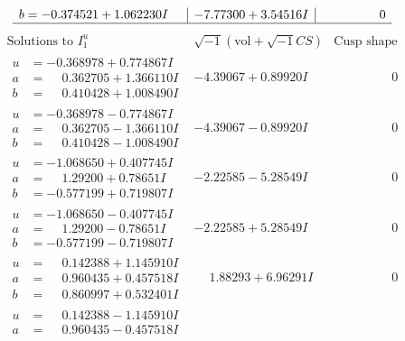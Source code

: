 \documentclass[1p]{elsarticle_modified}
\theoremstyle{definition}
\newcommand{\I}{\sqrt{-1}}
\begin{document}
$$\begin{array}{c|c|c}
\begin{aligned}
b &= -0.374521 + 1.062230 I\end{aligned}
 & -7.77300 + 3.54516 I & \phantom{-0.000000 } 0\\
 \hline 
 \end{array}$$\newpage$$\begin{array}{c|c|c}  
\text{Solutions to }I^u_{1}& \I (\text{vol} + \sqrt{-1}CS) & \text{Cusp shape}\\
 \hline 
\begin{aligned}
u &= -0.368978 + 0.774867 I \\
a &= \phantom{-}0.362705 + 1.366110 I \\
b &= \phantom{-}0.410428 + 1.008490 I\end{aligned}
 & -4.39067 + 0.89920 I & \phantom{-0.000000 } 0 \\ \hline\begin{aligned}
u &= -0.368978 - 0.774867 I \\
a &= \phantom{-}0.362705 - 1.366110 I \\
b &= \phantom{-}0.410428 - 1.008490 I\end{aligned}
 & -4.39067 - 0.89920 I & \phantom{-0.000000 } 0 \\ \hline\begin{aligned}
u &= -1.068650 + 0.407745 I \\
a &= \phantom{-}1.29200 + 0.78651 I \\
b &= -0.577199 + 0.719807 I\end{aligned}
 & -2.22585 - 5.28549 I & \phantom{-0.000000 } 0 \\ \hline\begin{aligned}
u &= -1.068650 - 0.407745 I \\
a &= \phantom{-}1.29200 - 0.78651 I \\
b &= -0.577199 - 0.719807 I\end{aligned}
 & -2.22585 + 5.28549 I & \phantom{-0.000000 } 0 \\ \hline\begin{aligned}
u &= \phantom{-}0.142388 + 1.145910 I \\
a &= \phantom{-}0.960435 + 0.457518 I \\
b &= \phantom{-}0.860997 + 0.532401 I\end{aligned}
 & \phantom{-}1.88293 + 6.96291 I & \phantom{-0.000000 } 0 \\ \hline\begin{aligned}
u &= \phantom{-}0.142388 - 1.145910 I \\
a &= \phantom{-}0.960435 - 0.457518 I \\

\end{aligned}
\end{array}$$
\end{document}
